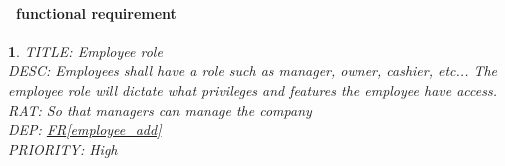 \documentclass{scrreprt}
\theoremstyle{funreq}
\newtheorem{funreq}{}
\newcommand*{\reqref}[1]{\hyperref[#1]{FR\ref*{#1}}}
\begin{document}
	\paragraph[]{\Subsectionname ~functional requirement }
	\begin{funreq}
		\label{employee_role}
		TITLE: Employee role\\
		DESC: Employees shall have a role such as manager, owner, cashier, etc...  The employee role will dictate what privileges and features the employee have access.\\
		RAT:  So that managers can manage the company\\
		DEP: \reqref{employee_add}\\
		PRIORITY: High\\
	\end{funreq}

\end{document}
